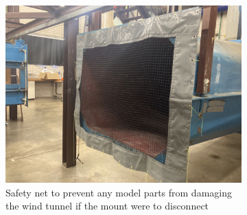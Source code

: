     


\begin{figure}[H]
     \centering
     \begin{subfigure}[b]{0.45\textwidth}
             \centering
            \includegraphics[scale =0.05]{04_Methodology/Figs/windTunnelNet.jpg}
            \caption{Safety net to prevent any model parts from damaging the wind tunnel if the mount were to disconnect}
            \label{fig:windTunnelNet}
     \end{subfigure}
     \hfill
     \begin{subfigure}[b]{0.45\textwidth}
                \centering

\end{subfigure}
\end{figure}

